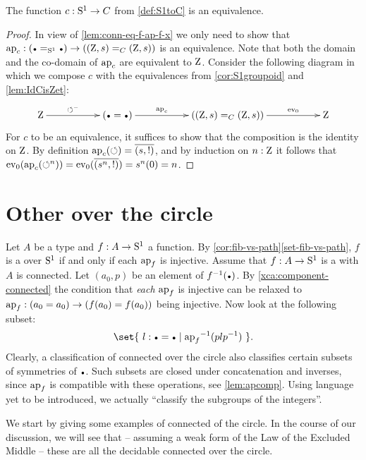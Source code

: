\begin{theorem}\label{thm:S1bysymmetries}
  The function $c:{\mathrm{S}^1}\to C$ from \cref{def:S1toC} is an equivalence.
\end{theorem}
\begin{proof}
  In view of \cref{lem:conn-eq-f-ap-f-x} we only need to show that 
$\ap{c}:(\base=_{\Sc}\base)\to((\zet,\etop{s})=_C(\zet,\etop{s}))$ is an equivalence.
Note that both the domain and the co-domain of $\ap{c}$ are equivalent to $\mathrm{Z}$.
Consider the following diagram in which we compose $c$ with the equivalences
from \cref{cor:S1groupoid} and \cref{lem:IdCisZet}:
\[
\xymatrix{
\zet\ar[rr]^-{\Sloop^{{-}}}&&
(\base=\base)\ar[rr]^-{\ap{c}}&&
((\zet,\etop{s})=_C(\zet,\etop{s}))\ar[rr]^-{\ev_0}&&
\zet}
\]
For $c$ to be an equivalence, it suffices to show that the composition
is the identity on $\mathrm{Z}$. By definition $\ap{c}(\Sloop) = \pathpair{\etop{s}}{!}$, 
and by induction on $n:\mathrm{Z}$ it follows that
$\ev_0(\ap{c}(\Sloop^n))=\ev_0(\pathpair{\etop{s}^n}{!}) = s^n(0) = n$.
\end{proof}

\section{Other \coverings over the circle}
\label{sec:covS1}

Let $A$ be a type and $f:A\to {\mathrm{S}^1}$ a function.
By \cref{cor:fib-vs-path}\ref{set-fib-vs-path}, $f$ is a \covering
over ${\mathrm{S}^1}$ if and only if each $\ap{f}$ is injective.
Assume that $f:A\to {\mathrm{S}^1}$ is a \covering with $A$ is connected.
Let $(a_0,p)$ be an element of $f^{-1}(\base)$. 
By \cref{xca:component-connected}
the condition that \emph{each} $\ap{f}$ is injective
can be relaxed to $\ap{f}: (a_0=a_0)\to(f(a_0)=f(a_0))$ being injective.
Now look at the following subset:
\[
\set{~ l: \base = \base \mid {\ap{f}}^{-1}(plp^{-1})~ }.
\]
Clearly, a classification of connected \coverings over the circle
also classifies certain subsets of symmetries of $\base$.
Such subsets are closed under concatenation and inverses,
since $\ap{f}$ is compatible with these operations,
see \cref{lem:apcomp}.
Using language yet to be introduced, we actually ``classify the subgroups of the integers''.

We start by giving some examples of connected \coverings of the circle.
In the course of our discussion, we will see that -- assuming a weak form
of the Law of the Excluded Middle -- these are all the decidable connected 
\coverings over the circle.

